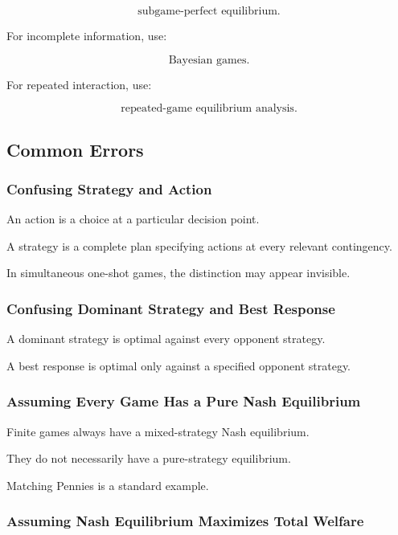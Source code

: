 \[
\boxed{
\text{subgame-perfect equilibrium}.
}
\]

For incomplete information, use:

\[
\boxed{
\text{Bayesian games}.
}
\]

For repeated interaction, use:

\[
\boxed{
\text{repeated-game equilibrium analysis}.
}
\]

\subsection{Common Errors}
\label{subsec:game-theory-common-errors}

\subsubsection{Confusing Strategy and Action}

An action is a choice at a particular decision point.

A strategy is a complete plan specifying actions at every relevant
contingency.

In simultaneous one-shot games, the distinction may appear invisible.

\subsubsection{Confusing Dominant Strategy and Best Response}

A dominant strategy is optimal against every opponent strategy.

A best response is optimal only against a specified opponent strategy.

\subsubsection{Assuming Every Game Has a Pure Nash Equilibrium}

Finite games always have a mixed-strategy Nash equilibrium.

They do not necessarily have a pure-strategy equilibrium.

Matching Pennies is a standard example.

\subsubsection{Assuming Nash Equilibrium Maximizes Total Welfare}

